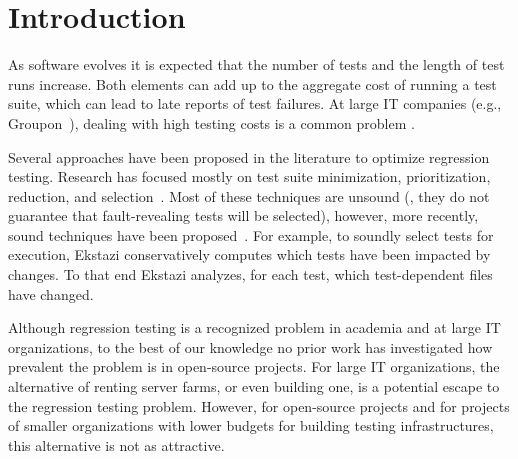 \section{Introduction}


As software evolves it is expected that the number of tests and the
length of test runs increase.  Both elements can add up to the
aggregate cost of running a test suite, which can lead to late reports of test
failures.  At large IT companies (e.g.,
Groupon~\cite{kim-etal-fse2013}), dealing with high testing costs is a
common problem .  

Several approaches have been proposed in the literature to optimize
regression testing.  Research has focused mostly on test suite
minimization, prioritization, reduction, and
selection~\cite{yoo-harman-stvr2012}.  Most of these techniques are
unsound (\ie{}, they do not guarantee that fault-revealing tests will
be selected), however, more recently, sound techniques have been
proposed~\cite{gligoric-etal-issta2015,soetens-etal-2016}.  For
example, to soundly select tests for execution,
Ekstazi\cite{ekstazi-web,gligoric-etal-issta2015} conservatively
computes which tests have been impacted by changes.  To that end
Ekstazi analyzes, for each test, which test-dependent files have
changed.


Although regression testing is a recognized problem in academia and at
large IT organizations, to the best of our knowledge no prior work has
investigated how prevalent the problem is in open-source projects.
For large IT organizations, the alternative of renting server farms,
or even building one, is a potential escape to the regression testing
problem.  However, for open-source projects and for projects of
smaller organizations with lower budgets for building testing
infrastructures, this alternative is not as attractive.

\newcommand{\numSubjs}{143}
\newcommand{\numLongRunning}{\Fix{17\%}}
\newcommand{\percentParallelForLongRunning}{\Fix{80\%}}

